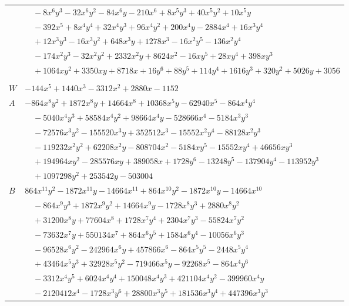 \documentclass[11pt]{article}
\begin{document}
\begin{longtable}{@{}ll@{}}
 & $\quad -8x^{6}y^{3}-32x^{6}y^{2}-84x^{6}y-210x^{6}+8x^{5}y^{3}+40x^{5}y^{2}+10x^{5}y$\\
 & $\quad -392x^{5}+8x^{4}y^{4}+32x^{4}y^{3}+96x^{4}y^{2}+200x^{4}y-2884x^{4}+16x^{3}y^{4}$\\
 & $\quad +12x^{3}y^{3}-16x^{3}y^{2}+648x^{3}y+1278x^{3}-16x^{2}y^{5}-136x^{2}y^{4}$\\
 & $\quad -174x^{2}y^{3}-32x^{2}y^{2}+2332x^{2}y+8624x^{2}-16xy^{5}+28xy^{4}+398xy^{3}$\\
 & $\quad +1064xy^{2}+3350xy+8718x+16y^{6}+88y^{5}+114y^{4}+1616y^{3}+320y^{2}+5026y+3056$\\
\addlinespace[3pt]
\multicolumn{2}{@{}l}{$g=2$, $i=30$, $m=72$, neighbours $6,7,8,9,15,20,24,38$}\\
$W$ & $-144x^{5}+1440x^{3}-3312x^{2}+2880x-1152$\\
$A$ & $-864x^{8}y^{2}+1872x^{8}y+14664x^{8}+10368x^{5}y-62940x^{5}-864x^{4}y^{4}$\\
 & $\quad -5040x^{4}y^{3}+58584x^{4}y^{2}+98664x^{4}y-528666x^{4}-5184x^{3}y^{3}$\\
 & $\quad -72576x^{3}y^{2}-155520x^{3}y+352512x^{3}-15552x^{2}y^{4}-88128x^{2}y^{3}$\\
 & $\quad -119232x^{2}y^{2}+62208x^{2}y-808704x^{2}-5184xy^{5}-15552xy^{4}+46656xy^{3}$\\
 & $\quad +194964xy^{2}-285576xy+389058x+1728y^{6}-13248y^{5}-137904y^{4}-113952y^{3}$\\
 & $\quad +1097298y^{2}+253542y-503004$\\
$B$ & $864x^{11}y^{2}-1872x^{11}y-14664x^{11}+864x^{10}y^{2}-1872x^{10}y-14664x^{10}$\\
 & $\quad -864x^{9}y^{3}+1872x^{9}y^{2}+14664x^{9}y-1728x^{8}y^{3}+2880x^{8}y^{2}$\\
 & $\quad +31200x^{8}y+77604x^{8}+1728x^{7}y^{4}+2304x^{7}y^{3}-55824x^{7}y^{2}$\\
 & $\quad -73632x^{7}y+550134x^{7}+864x^{6}y^{5}+1584x^{6}y^{4}-10056x^{6}y^{3}$\\
 & $\quad -96528x^{6}y^{2}-242964x^{6}y+457866x^{6}-864x^{5}y^{5}-2448x^{5}y^{4}$\\
 & $\quad +43464x^{5}y^{3}+32928x^{5}y^{2}-719466x^{5}y-92268x^{5}-864x^{4}y^{6}$\\
 & $\quad -3312x^{4}y^{5}+6024x^{4}y^{4}+150048x^{4}y^{3}+421104x^{4}y^{2}-399960x^{4}y$\\
 & $\quad -2120412x^{4}-1728x^{3}y^{6}+28800x^{3}y^{5}+181536x^{3}y^{4}+447396x^{3}y^{3}$\\

\end{longtable}
\end{document}
